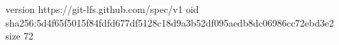 version https://git-lfs.github.com/spec/v1
oid sha256:5d4f65f5015f84fdfd677df5128c18d9a3b52df095aedb8dc06986cc72ebd3e2
size 72
